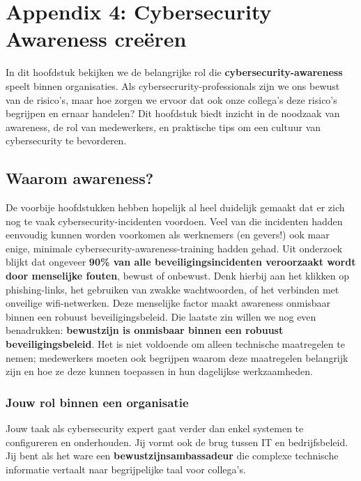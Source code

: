 \documentclass[
  10pt,
  dutch,
  paper=a4,
  ,captions=tableheading
]{scrbook}
\begin{document}
\chapter{Appendix 4: Cybersecurity Awareness
creëren}\label{appendix-4-cybersecurity-awareness-creuxebren}

In dit hoofdstuk bekijken we de belangrijke rol die
\textbf{cybersecurity-awareness} speelt binnen organisaties. Als
cybersecrurity-professionals zijn we ons bewust van de risico's, maar
hoe zorgen we ervoor dat ook onze collega's deze risico's begrijpen en
ernaar handelen? Dit hoofdstuk biedt inzicht in de noodzaak van
awareness, de rol van medewerkers, en praktische tips om een cultuur van
cybersecurity te bevorderen.

\section{Waarom awareness?}\label{waarom-awareness}

De voorbije hoofdstukken hebben hopelijk al heel duidelijk gemaakt dat
er zich nog te vaak cybersecurity-incidenten voordoen. Veel van die
incidenten hadden eenvoudig kunnen worden voorkomen als werknemers (en
gevers!) ook maar enige, minimale cybersecurity-awareness-training
hadden gehad. Uit onderzoek blijkt dat ongeveer \textbf{90\% van alle
beveiligingsincidenten veroorzaakt wordt door menselijke fouten}, bewust
of onbewust. Denk hierbij aan het klikken op phishing-links, het
gebruiken van zwakke wachtwoorden, of het verbinden met onveilige
wifi-netwerken. Deze menselijke factor maakt awareness onmisbaar binnen
een robuust beveiligingsbeleid. Die laatste zin willen we nog even
benadrukken: \textbf{bewustzijn is onmisbaar binnen een robuust
beveiligingsbeleid}. Het is niet voldoende om alleen technische
maatregelen te nemen; medewerkers moeten ook begrijpen waarom deze
maatregelen belangrijk zijn en hoe ze deze kunnen toepassen in hun
dagelijkse werkzaamheden.

\subsection{Jouw rol binnen een
organisatie}\label{jouw-rol-binnen-een-organisatie}

Jouw taak als cybersecurity expert gaat verder dan enkel systemen te
configureren en onderhouden. Jij vormt ook de brug tussen IT en
bedrijfsbeleid. Jij bent als het ware een
\textbf{bewustzijnsambassadeur} die complexe technische informatie
vertaalt naar begrijpelijke taal voor collega's.
\end{document}
